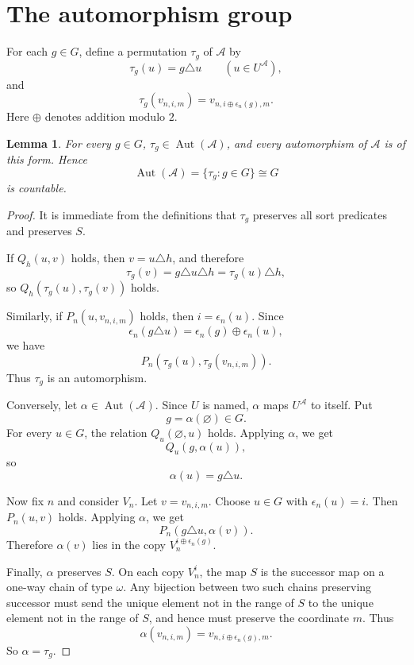 \documentclass[11pt]{article}
\newtheorem{lemma}{Lemma}
\newcommand{\Aut}{\operatorname{Aut}}
\begin{document}
\section*{The automorphism group}

For each $g\in G$, define a permutation $\tau_g$ of $\mathcal A$ by
\[
\tau_g(u)=g\triangle u\qquad(u\in U^{\mathcal A}),
\]
and
\[
\tau_g(v_{n,i,m})=v_{n,i\oplus \epsilon_n(g),m}.
\]
Here $\oplus$ denotes addition modulo $2$.

\begin{lemma}
For every $g\in G$, $\tau_g\in\Aut(\mathcal A)$, and every automorphism of
$\mathcal A$ is of this form.  Hence
\[
\Aut(\mathcal A)=\{\tau_g:g\in G\}\cong G
\]
is countable.
\end{lemma}

\begin{proof}
It is immediate from the definitions that $\tau_g$ preserves all sort predicates and preserves $S$.

If $Q_h(u,v)$ holds, then $v=u\triangle h$, and therefore
\[
\tau_g(v)=g\triangle u\triangle h=\tau_g(u)\triangle h,
\]
so $Q_h(\tau_g(u),\tau_g(v))$ holds.

Similarly, if $P_n(u,v_{n,i,m})$ holds, then $i=\epsilon_n(u)$.  Since
\[
\epsilon_n(g\triangle u)=\epsilon_n(g)\oplus\epsilon_n(u),
\]
we have
\[
P_n(\tau_g(u),\tau_g(v_{n,i,m})).
\]
Thus $\tau_g$ is an automorphism.

Conversely, let $\alpha\in\Aut(\mathcal A)$.  Since $U$ is named, $\alpha$ maps $U^{\mathcal A}$ to itself.  Put
\[
g=\alpha(\varnothing)\in G.
\]
For every $u\in G$, the relation $Q_u(\varnothing,u)$ holds.  Applying $\alpha$, we get
\[
Q_u(g,\alpha(u)),
\]
so
\[
\alpha(u)=g\triangle u.
\]

Now fix $n$ and consider $V_n$.  Let $v=v_{n,i,m}$.  Choose $u\in G$ with
$\epsilon_n(u)=i$.  Then $P_n(u,v)$ holds.  Applying $\alpha$, we get
\[
P_n(g\triangle u,\alpha(v)).
\]
Therefore $\alpha(v)$ lies in the copy $V_n^{i\oplus\epsilon_n(g)}$.

Finally, $\alpha$ preserves $S$.  On each copy $V_n^i$, the map $S$ is the successor map on a one-way chain of type $\omega$.  Any bijection between two such chains preserving successor must send the unique element not in the range of $S$ to the unique element not in the range of $S$, and hence must preserve the coordinate $m$.  Thus
\[
\alpha(v_{n,i,m})=v_{n,i\oplus\epsilon_n(g),m}.
\]
So $\alpha=\tau_g$.
\end{proof}
\end{document}
